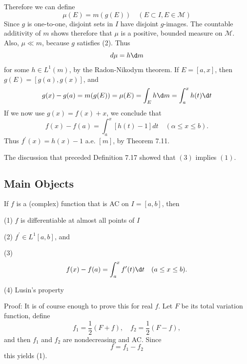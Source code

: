 \documentclass[12pt, a4paper, oneside]{book}
\begin{document}
\begin{theorem}
    Therefore we can define
    \begin{equation*}
        \mu(E)=m(g(E)) \quad (E \subset I, E \in \mathcal{M})
    \end{equation*}
    Since $g$ is one-to-one, disjoint sets in $I$ have disjoint $g$-images. The countable additivity of $m$ shows therefore that $\mu$ is a positive, bounded measure on $\mathcal{M}$.
    Also, $\mu \ll m$, because $g$ satisfies (2).
    Thus
    \begin{equation*}
        d \mu=h \d m
    \end{equation*}
    for some $h \in L^1(m)$, by the Radon-Nikodym theorem.
    If $E=[a, x]$, then $g(E)=[g(a), g(x)]$, and
    \begin{equation*}
        g(x)-g(a)
        =
        m(g(E))=\mu(E)
        =
        \int_E h \d m
        =
        \int_a^x h(t) \d t
    \end{equation*}
    If we now use $g(x)=f(x)+x$, we conclude that
    \begin{equation*}
        f(x)-f(a)=\int_a^x[h(t)-1] d t \quad(\alpha \leq x \leq b) .
    \end{equation*}
    Thus $f^{\prime}(x)=h(x)-1$ a.e. $[m]$, by Theorem 7.11.

    The discussion that preceded Definition 7.17 showed that $(3)$ implies $(1)$.
\end{theorem}

\subsection{Main Objects}
\begin{theorem}
    If $f$ is a (complex) function that is AC on $I=[a, b]$, then

    (1) $f$ is differentiable at almost all points of $I$

    (2) $f^{\prime} \in L^1\left[a,b\right]$, and

    (3)
    \begin{equation*}
        f(x)-f(a)=\int_a^x f^{\prime}(t) \d t \quad(a \leq x \leq b) .
    \end{equation*}

    (4) Lusin's property

    Proof:
    It is of course enough to prove this for real $f$. Let $F$ be its total variation function, define
    \begin{equation*}
        f_1=\frac{1}{2}(F+f), \quad f_2=\frac{1}{2}(F-f),
    \end{equation*}
    and then $f_1$ and $f_2$ are nondecreasing and AC. Since
    \begin{equation*}
        f=f_1-f_2
    \end{equation*}
    this yields (1).
\end{theorem}
\end{document}
